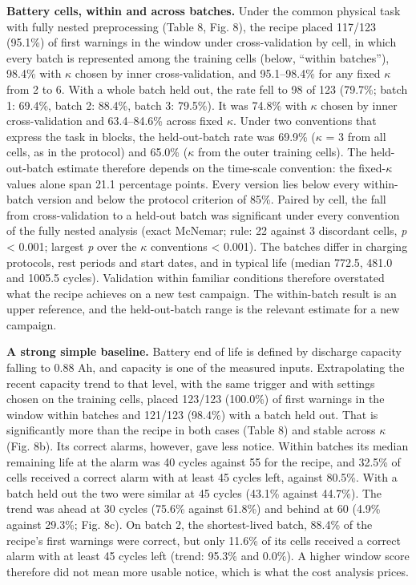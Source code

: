 \documentclass[a4paper,fleqn,doubleblind]{cas-dc}
\begin{document}
\textbf{Battery cells, within and across batches.} Under the common physical task with fully nested preprocessing (Table 8, Fig. 8), the recipe placed 117/123 (95.1\%) of first warnings in the window under cross-validation by cell, in which every batch is represented among the training cells (below, ``within batches''), 98.4\% with $\kappa$ chosen by inner cross-validation, and 95.1--98.4\% for any fixed $\kappa$ from 2 to 6. With a whole batch held out, the rate fell to 98 of 123 (79.7\%; batch 1: 69.4\%, batch 2: 88.4\%, batch 3: 79.5\%). It was 74.8\% with $\kappa$ chosen by inner cross-validation and 63.4--84.6\% across fixed $\kappa$. Under two conventions that express the task in blocks, the held-out-batch rate was 69.9\% ($\kappa$ = 3 from all cells, as in the protocol) and 65.0\% ($\kappa$ from the outer training cells). The held-out-batch estimate therefore depends on the time-scale convention: the fixed-$\kappa$ values alone span 21.1 percentage points. Every version lies below every within-batch version and below the protocol criterion of 85\%. Paired by cell, the fall from cross-validation to a held-out batch was significant under every convention of the fully nested analysis (exact McNemar; rule: 22 against 3 discordant cells, \textit{p} < 0.001; largest \textit{p} over the $\kappa$ conventions < 0.001). The batches differ in charging protocols, rest periods and start dates, and in typical life (median 772.5, 481.0 and 1005.5 cycles). Validation within familiar conditions therefore overstated what the recipe achieves on a new test campaign. The within-batch result is an upper reference, and the held-out-batch range is the relevant estimate for a new campaign.

\textbf{A strong simple baseline.} Battery end of life is defined by discharge capacity falling to 0.88 Ah, and capacity is one of the measured inputs. Extrapolating the recent capacity trend to that level, with the same trigger and with settings chosen on the training cells, placed 123/123 (100.0\%) of first warnings in the window within batches and 121/123 (98.4\%) with a batch held out. That is significantly more than the recipe in both cases (Table 8) and stable across $\kappa$ (Fig. 8b). Its correct alarms, however, gave less notice. Within batches its median remaining life at the alarm was 40 cycles against 55 for the recipe, and 32.5\% of cells received a correct alarm with at least 45 cycles left, against 80.5\%. With a batch held out the two were similar at 45 cycles (43.1\% against 44.7\%). The trend was ahead at 30 cycles (75.6\% against 61.8\%) and behind at 60 (4.9\% against 29.3\%; Fig. 8c). On batch 2, the shortest-lived batch, 88.4\% of the recipe's first warnings were correct, but only 11.6\% of its cells received a correct alarm with at least 45 cycles left (trend: 95.3\% and 0.0\%). A higher window score therefore did not mean more usable notice, which is what the cost analysis prices.
\end{document}
